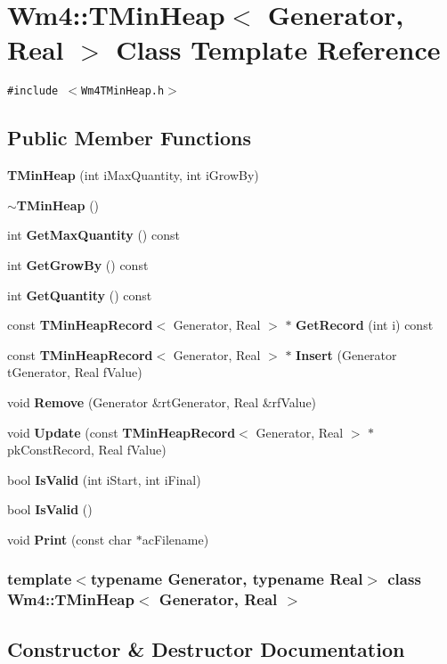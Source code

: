 \section{Wm4::TMin\-Heap$<$ Generator, Real $>$ Class Template Reference}
\label{classWm4_1_1TMinHeap}
{\tt \#include $<$Wm4TMin\-Heap.h$>$}

\subsection*{Public Member Functions}
\begin{CompactItemize}
\item 
{\bf TMin\-Heap} (int i\-Max\-Quantity, int i\-Grow\-By)
\item 
{\bf $\sim$TMin\-Heap} ()
\item 
int {\bf Get\-Max\-Quantity} () const
\item 
int {\bf Get\-Grow\-By} () const
\item 
int {\bf Get\-Quantity} () const
\item 
const {\bf TMin\-Heap\-Record}$<$ Generator, Real $>$ $\ast$ {\bf Get\-Record} (int i) const
\item 
const {\bf TMin\-Heap\-Record}$<$ Generator, Real $>$ $\ast$ {\bf Insert} (Generator t\-Generator, Real f\-Value)
\item 
void {\bf Remove} (Generator \&rt\-Generator, Real \&rf\-Value)
\item 
void {\bf Update} (const {\bf TMin\-Heap\-Record}$<$ Generator, Real $>$ $\ast$pk\-Const\-Record, Real f\-Value)
\item 
bool {\bf Is\-Valid} (int i\-Start, int i\-Final)
\item 
bool {\bf Is\-Valid} ()
\item 
void {\bf Print} (const char $\ast$ac\-Filename)
\end{CompactItemize}
\subsubsection*{template$<$typename Generator, typename Real$>$ class Wm4::TMin\-Heap$<$ Generator, Real $>$}



\subsection{Constructor \& Destructor Documentation}
